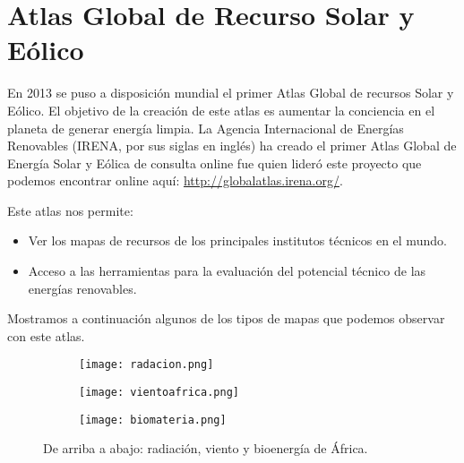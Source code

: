 \section{Atlas Global de Recurso Solar y Eólico}

En 2013 se puso a disposición mundial el primer Atlas Global de recursos Solar y Eólico. El objetivo de la creación de este atlas es aumentar la conciencia en el planeta de generar energía limpia. La  Agencia Internacional de Energías Renovables (IRENA, por sus siglas en inglés) ha creado el primer Atlas Global de Energía Solar y Eólica de consulta online fue quien lideró este proyecto que podemos encontrar online aquí: \url{http://globalatlas.irena.org/}.

Este atlas nos permite:
\begin{itemize}
\item Ver los mapas de recursos de los principales institutos técnicos en el mundo.
\item Acceso a las herramientas para la evaluación del potencial técnico de las energías renovables.
\end{itemize}

Mostramos a continuación algunos de los tipos de mapas que podemos observar con este atlas.

\begin{figure}[ht!]
\begin{center}
\begin{figurebox}
  \centering
    \begin{subfigure}{\textwidth}
  \centering
   \texttt{[image: radacion.png]}
\end{subfigure}
 \begin{subfigure}{\textwidth}
  \centering
   \texttt{[image: vientoafrica.png]}
\end{subfigure}
\begin{subfigure}{\textwidth}
\centering
  \texttt{[image: biomateria.png]}
 \end{subfigure}
 \caption{De arriba a abajo: radiación, viento y bioenergía de África.} \label{fig:mapas}
\end{figurebox}
\end{center}
\end{figure}





